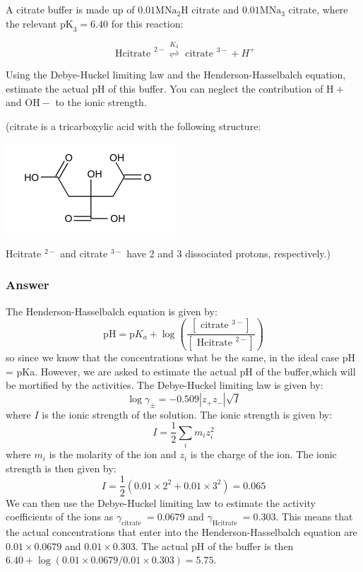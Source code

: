 \documentclass[12pt]{article}
\begin{document}
\subsection{}
A citrate buffer is made up of $0.01 \mathrm{M} \mathrm{Na}_{2} \mathrm{H}$ citrate and $0.01 \mathrm{M} \mathrm{Na}_{3}$ citrate, where the relevant $\mathrm{pK}_{3}=6.40$ for this reaction:

$$
\text { Hcitrate }^{2-} \stackrel{K_{3}}{\rightleftharpoons} \text { citrate }^{3-}+H^{+}
$$

Using the Debye-Huckel limiting law and the Henderson-Hasselbalch equation, estimate the actual $\mathrm{pH}$ of this buffer. You can neglect the contribution of $\mathrm{H}+$ and $\mathrm{OH}-$ to the ionic strength.

(citrate is a tricarboxylic acid with the following structure:

\includegraphics{smile-lvslvvf9smi5kvdw2w.png}


Hcitrate ${ }^{2-}$ and citrate ${ }^{3-}$ have 2 and 3 dissociated protons, respectively.)
\subsubsection{Answer}
The Henderson-Hasselbalch equation is given by:
\begin{equation}
  \mathrm{pH} = \mathrm{p}K_{a}+\log \left(\frac{[\text { citrate }^{3-}]}{[\text { Hcitrate }^{2-}]}\right)
\end{equation}
so since we know that the concentrations what be the same, in the ideal case pH = pKa. However, we are asked to estimate the actual pH of the buffer,which will be mortified by the activities. The Debye-Huckel limiting law is given by:
\begin{equation}
  \log \gamma_{\pm}=-0.509\left|z_{+} z_{-}\right| \sqrt{I}
\end{equation}
where $I$ is the ionic strength of the solution. The ionic strength is given by:
\begin{equation}
  I = \frac{1}{2} \sum_{i} m_{i} z_{i}^{2}
\end{equation}
where $m_{i}$ is the molarity of the ion and $z_{i}$ is the charge of the ion. The ionic strength is then given by:
\begin{equation}
  I = \frac{1}{2} \left(0.01 \times 2^{2} + 0.01 \times 3^{2}\right) = 0.065
\end{equation}
We can then use the Debye-Huckel limiting law to estimate the activity coefficients of the ions as $\gamma_{\text {citrate }}=0.0679$ and $\gamma_{\text {Hcitrate }}= 0.303$.
This means  that the actual concentrations that enter into the Henderson-Hasselbalch equation are $0.01 \times 0.0679$ and $0.01 \times 0.303$. The actual pH of the buffer is then $6.40 + \log(0.01 \times 0.0679 / 0.01 \times 0.303) = 5.75$.
\end{document}
